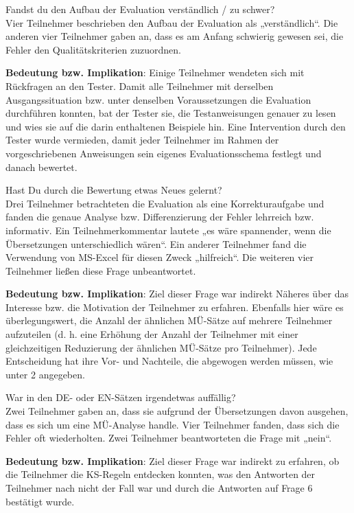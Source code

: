 \begin{description}[font = \normalfont]
\item[3.] Fandst du den Aufbau der Evaluation verständlich / zu schwer?\\
Vier Teilnehmer beschrieben den Aufbau der Evaluation als „verständlich“. Die anderen vier Teilnehmer gaben an, dass es am Anfang schwierig gewesen sei, die Fehler den Qualitätskriterien zuzuordnen.

\textbf{Bedeutung bzw. Implikation}: Einige Teilnehmer wendeten sich mit Rückfragen an den Tester. Damit alle Teilnehmer mit derselben Ausgangssituation bzw. unter denselben Voraussetzungen die Evaluation durchführen konnten, bat der Tester sie, die Testanweisungen genauer zu lesen und wies sie auf die darin enthaltenen Beispiele hin. Eine Intervention durch den Tester wurde vermieden, damit jeder Teilnehmer im Rahmen der vorgeschriebenen Anweisungen sein eigenes Evaluationsschema festlegt und danach bewertet.

\item [4.] Hast Du durch die Bewertung etwas Neues gelernt?\\
Drei Teilnehmer betrachteten die Evaluation als eine Korrekturaufgabe und fanden die genaue Analyse bzw. Differenzierung der Fehler lehrreich bzw. informativ. Ein Teilnehmerkommentar lautete „es wäre spannender, wenn die Übersetzungen unterschiedlich wären“. Ein anderer Teilnehmer fand die Verwendung von MS-Excel für diesen Zweck „hilfreich“. Die weiteren vier Teilnehmer ließen diese Frage unbeantwortet.

\textbf{Bedeutung bzw. Implikation}: Ziel dieser Frage war indirekt Näheres über das Interesse bzw. die Motivation der Teilnehmer zu erfahren. Ebenfalls hier wäre es überlegungswert, die Anzahl der ähnlichen MÜ-Sätze auf mehrere Teilnehmer aufzuteilen (d. h. eine Erhöhung der Anzahl der Teilnehmer mit einer gleichzeitigen Reduzierung der ähnlichen MÜ-Sätze pro Teilnehmer). Jede Entscheidung hat ihre Vor- und Nachteile, die abgewogen werden müssen, wie unter 2 angegeben.

\newpage
\item[5.] War in den DE- oder EN-Sätzen irgendetwas auffällig?\\
Zwei Teilnehmer gaben an, dass sie aufgrund der Übersetzungen davon ausgehen, dass es sich um eine MÜ-Analyse handle. Vier Teilnehmer fanden, dass sich die Fehler oft wiederholten. Zwei Teilnehmer beantworteten die Frage mit „nein“.

\textbf{Bedeutung bzw. Implikation}: Ziel dieser Frage war indirekt zu erfahren, ob die Teilnehmer die KS-Regeln entdecken konnten, was den Antworten der Teilnehmer nach nicht der Fall war und durch die Antworten auf Frage 6 bestätigt wurde.


\end{description}
